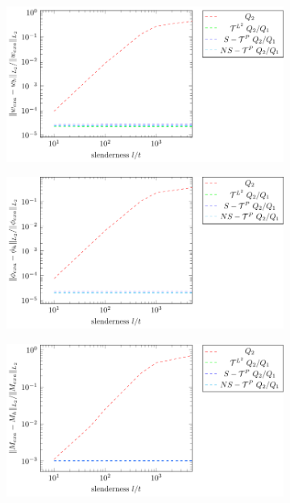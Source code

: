 \documentclass{article}
\begin{document}
\begin{figure}
    \centering
    \begin{subfigure}[b]{0.49\linewidth}        %
        \centering
        \includegraphics[width=\linewidth]{slenderness_w}
        \caption{}
        \vspace*{2mm}
    \end{subfigure}
    \begin{subfigure}[b]{0.49\linewidth}        %
        \centering
        \includegraphics[width=\linewidth]{slenderness_phi}
        \caption{}
        \vspace*{2mm}
    \end{subfigure}
        \begin{subfigure}[b]{0.49\linewidth}        %
        \centering
        \includegraphics[width=\linewidth]{slenderness_M}

\end{subfigure}
\end{figure}
\end{document}
